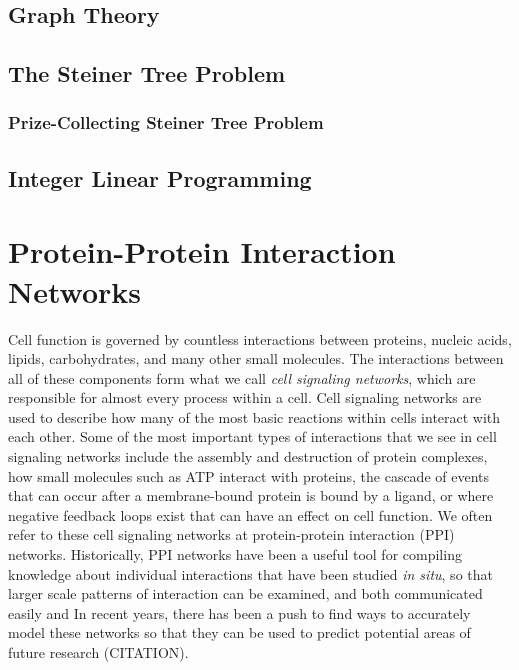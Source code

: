 \documentclass[12pt,twoside]{reedthesis}
\theoremstyle{definition}
\begin{document}
 \section{Graph Theory}

 \section{The Steiner Tree Problem}

  \subsection{Prize-Collecting Steiner Tree Problem}

 \section{Integer Linear Programming}

\chapter{Protein-Protein Interaction Networks}

Cell function is governed by countless interactions between proteins, nucleic acids, lipids, carbohydrates, and many other small molecules.  The interactions between all of these components form what we call \textit{cell signaling networks}, which are responsible for almost every process within a cell.  Cell signaling networks are used to describe how many of the most basic reactions within cells interact with each other.  Some of the most important types of interactions that we see in cell signaling networks include the assembly and destruction of protein complexes, how small molecules such as ATP interact with proteins, the cascade of events that can occur after a membrane-bound protein is bound by a ligand, or where negative feedback loops exist that can have an effect on cell function.  We often refer to these cell signaling networks at protein-protein interaction (PPI) networks.  Historically, PPI networks have been a useful tool for compiling knowledge about individual interactions that have been studied \textit{in situ}, so that larger scale patterns of interaction can be examined, and both communicated easily and   In recent years, there has been a push to find ways to accurately model these networks so that they can be used to predict potential areas of future research (CITATION).\par
\end{document}
